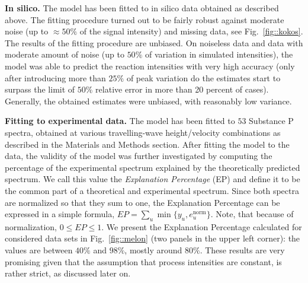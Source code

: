 \documentclass{llncs}
\begin{document}
\textbf{In silico.} The model has been fitted to in silico data obtained as described above. The fitting procedure turned out to be fairly robust against moderate noise (up to $ \approx 50\%$ of the signal intensity) and missing data, see Fig.~\ref{fig::kokos}. The results of the fitting procedure are unbiased. On noiseless data and data with moderate amount of noise (up to $50\%$ of variation in simulated intensities), the model was able to predict the reaction intensities with very high accuracy (only after introducing more than $25\%$ of peak variation do the estimates start to surpass the limit of $50\%$ relative error in more than 20 percent of cases). Generally, the obtained estimates were unbiased, with reasonably low variance.

\textbf{Fitting to experimental data.} The model has been fitted to $53$ Substance P spectra, obtained at various travelling-wave height/velocity combinations as described in the Materials and Methods section. After fitting the model to the data, the validity of the model was further investigated by computing the percentage of the experimental spectrum explained by the theoretically predicted spectrum. We call this value the \textit{Explanation Percentage} (EP) and define it to be the common part of a theoretical and experimental spectrum. Since both spectra are normalized so that they sum to one, the Explanation Percentage can be expressed in a simple formula,
$ EP = \sum_u \min\{y_u, e_u^\text{norm}\}.$
Note, that because of normalization, $0 \leq EP \leq 1$. We present the Explanation Percentage calculated for considered data sets in Fig.~\ref{fig::melon} (two panels in the upper left corner): the values are between $40\%$ and $98\%$, mostly around $80\%$. These results are very promising given that the assumption that process intensities are constant, is rather strict, as discussed later on.
\end{document}
